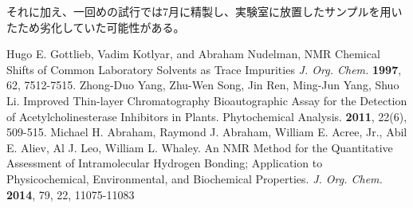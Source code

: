 \documentclass{ltjsarticle}
\theoremstyle{definition}
\numberwithin{equation}{section}
\begin{document}
それに加え、一回めの試行では7月に精製し、実験室に放置したサンプルを用いたため劣化していた可能性がある。
\begin{thebibliography}{99}
Hugo E. Gottlieb, Vadim Kotlyar, and
Abraham Nudelman, 
NMR Chemical Shifts of Common
Laboratory Solvents as Trace Impurities
\textit{J. Org. Chem.}  \textbf{1997}, 62, 7512-7515.
Zhong-Duo Yang, Zhu-Wen Song, Jin Ren, Ming-Jun Yang, Shuo Li.
Improved Thin-layer Chromatography Bioautographic Assay for the Detection of Acetylcholinesterase Inhibitors in Plants.
Phytochemical Analysis. \textbf{2011}, 22(6), 509-515.
Michael H. Abraham, Raymond J. Abraham, William E. Acree, Jr., Abil E. Aliev, Al J. Leo, William L. Whaley. 
An NMR Method for the Quantitative Assessment of Intramolecular Hydrogen Bonding; Application to Physicochemical, Environmental, and Biochemical Properties.
\textit{J. Org. Chem.} \textbf{2014}, 79, 22, 11075-11083
\end{thebibliography}

\clearpage

\end{document}
